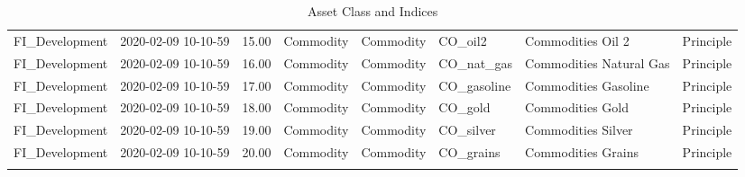 \begin{longtable}{llrlllll}
  FI\_Development & 2020-02-09 10-10-59 & 15.00 & Commodity & Commodity & CO\_oil2 & Commodities Oil 2 & Principle \\ 
  FI\_Development & 2020-02-09 10-10-59 & 16.00 & Commodity & Commodity & CO\_nat\_gas & Commodities Natural Gas & Principle \\ 
  FI\_Development & 2020-02-09 10-10-59 & 17.00 & Commodity & Commodity & CO\_gasoline & Commodities Gasoline & Principle \\ 
  FI\_Development & 2020-02-09 10-10-59 & 18.00 & Commodity & Commodity & CO\_gold & Commodities Gold & Principle \\ 
  FI\_Development & 2020-02-09 10-10-59 & 19.00 & Commodity & Commodity & CO\_silver & Commodities Silver & Principle \\ 
  FI\_Development & 2020-02-09 10-10-59 & 20.00 & Commodity & Commodity & CO\_grains & Commodities Grains & Principle \\ 
   \hline
\hline
\caption{Asset Class and Indices} 
\end{longtable}
